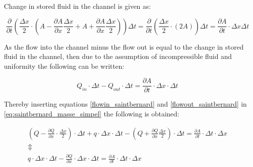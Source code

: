 Change in stored fluid in the channel is given as:

\begin{equation}\label{stored_saintbernard}
\frac{\partial}{\partial t} \left(\frac{\Delta x}{2} \cdot \left(A- \frac{\partial A}{\partial x} \frac{\Delta x}{2} +A + \frac{\partial A}{\partial x} \frac{\Delta x}{2}	\right) \right) \Delta t = \frac{\partial}{\partial t} \left(\frac{\Delta x}{2} \cdot \left( 2 A	\right) \right) \Delta t = \frac{\partial A}{\partial t} \cdot \Delta x	\Delta t
\end{equation}


As the flow into the channel minus the flow out is equal to the change in stored fluid in the channel, then due to the assumption of incompressible fluid and uniformity the following can be written:  

\begin{equation}\label{eq:saintbernard_masse_simpel}
	Q_{in}\cdot \Delta t - Q_{out}\cdot \Delta t = \frac{\partial A}{\partial t} \cdot \Delta x	\cdot \Delta t
\end{equation}

Thereby inserting equations \ref{flowin_saintbernard} and \ref{flowout_saintbernard} in \ref{eq:saintbernard_masse_simpel} the following is obtained:

\begin{equation}
\begin{array}{l}
	\left(Q - \frac{\partial Q}{\partial x}\cdot \frac{\Delta x}{2}\right) \cdot \Delta t + q \cdot \Delta x \cdot \Delta t - \left(Q + \frac{\partial Q}{ \partial x} \frac{\Delta x}{2} \right) \cdot \Delta t  = \frac{\partial A}{\partial t}\cdot \Delta t 
	\cdot \Delta x \\ 
\Updownarrow \\
q \cdot \Delta x \cdot \Delta t  - \frac{\partial Q}{\partial x} \cdot \Delta x \cdot \Delta t  = \frac{\partial A}{\partial t} \cdot \Delta t 
	\cdot \Delta x 
\end{array}
\label{saintbernard_masse}
\end{equation}

